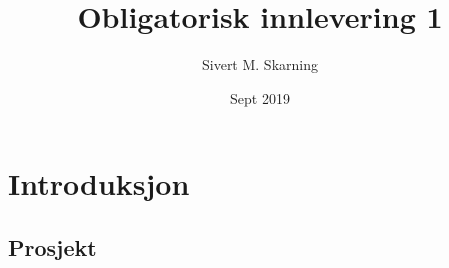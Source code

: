 \documentclass{article}
\title{Obligatorisk innlevering 1}
\author{Sivert M. Skarning}
\date{Sept 2019}
\begin{document}
\maketitle
\clearpage
\tableofcontents
\clearpage
\section{Introduksjon}
\subsection{Prosjekt}
\end{document}
